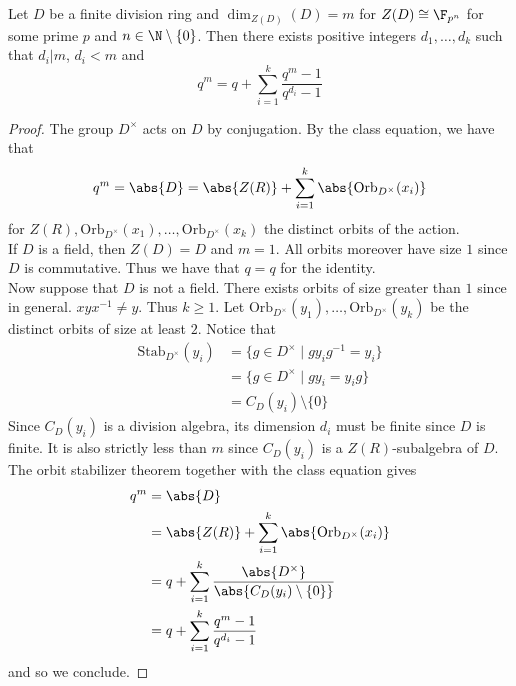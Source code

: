 \documentclass[a4paper]{article}
\begin{document}
\begin{prp}{}{} Let $D$ be a finite division ring and $\dim_{Z(D)}(D)=m$ for $Z(D)\cong\F_{p^n}$ for some prime $p$ and $n\in\N\setminus\{0\}$. Then there exists positive integers $d_1,\dots,d_k$ such that $d_i|m$, $d_i<m$ and $$q^m=q+\sum_{i=1}^k\frac{q^m-1}{q^{d_i}-1}$$ 
\begin{proof}
The group $D^\times$ acts on $D$ by conjugation. By the class equation, we have that $$q^m=\abs{D}=\abs{Z(R)}+\sum_{i=1}^k\abs{\text{Orb}_{D^\times}(x_i)}$$ for $Z(R),\text{Orb}_{D^\times}(x_1),\dots,\text{Orb}_{D^\times}(x_k)$ the distinct orbits of the action. \\

If $D$ is a field, then $Z(D)=D$ and $m=1$. All orbits moreover have size $1$ since $D$ is commutative. Thus we have that $q=q$ for the identity. \\

Now suppose that $D$ is not a field. There exists orbits of size greater than $1$ since in general. $xyx^{-1}\neq y$. Thus $k\geq 1$. Let $\text{Orb}_{D^\times}(y_1),\dots,\text{Orb}_{D^\times}(y_k)$ be the distinct orbits of size at least $2$. Notice that 
\begin{align*}
\text{Stab}_{D^\times}(y_i)&=\{g\in D^\times\;|\;gy_ig^{-1}=y_i\}\\
&=\{g\in D^\times\;|\;gy_i=y_ig\}\\
&=C_D(y_i)\setminus\{0\}
\end{align*}
Since $C_D(y_i)$ is a division algebra, its dimension $d_i$ must be finite since $D$ is finite. It is also strictly less than $m$ since $C_D(y_i)$ is a $Z(R)$-subalgebra of $D$. The orbit stabilizer theorem together with the class equation gives 
\begin{align*}
q^m&=\abs{D}\\
&=\abs{Z(R)}+\sum_{i=1}^k\abs{\text{Orb}_{D^\times}(x_i)}\\
&=q+\sum_{i=1}^k\frac{\abs{D^\times}}{\abs{C_D(y_i)\setminus\{0\}}}\\
&=q+\sum_{i=1}^k\frac{q^m-1}{q^{d_i}-1}
\end{align*}
and so we conclude. 
\end{proof}
\end{prp}
\end{document}
